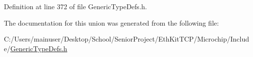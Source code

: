 Definition at line 372 of file Generic\+Type\+Defs.\+h.



The documentation for this union was generated from the following file\+:\begin{DoxyCompactItemize}
\item 
C\+:/\+Users/mainuser/\+Desktop/\+School/\+Senior\+Project/\+Eth\+Kit\+T\+C\+P/\+Microchip/\+Include/\hyperlink{_generic_type_defs_8h}{Generic\+Type\+Defs.\+h}\end{DoxyCompactItemize}
